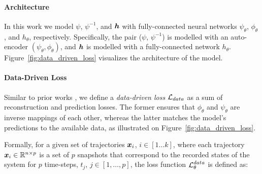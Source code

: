 \paragraph{Architecture} In this work we model $\psi$, $\psi^{-1}$, and $\boldsymbol{h}$ with fully-connected neural networks $\psi_\theta$, $\phi_\theta$, and $h_\theta$, respectively. Specifically, the pair ($\psi$, $\psi^{-1}$) is modelled with an auto-encoder $(\psi_\theta, \phi_\theta)$, and $\boldsymbol{h}$ is modelled with a fully-connected network $h_\theta$. Figure~\ref{fig:data_driven_loss} visualizes the architecture of the model.

\paragraph{Data-Driven Loss} Similar to prior works \cite{takeishi2017learning,morton2019deep,gin2021deep}, we define a \textit{data-driven loss} $\operatorname{\mathcal{L}}_{data}$ as a sum of reconstruction and prediction losses. The former ensures that $\phi_\theta$ and $\psi_\theta$ are inverse mappings of each other, whereas the latter matches the model's predictions to the available data, as illustrated on Figure~\ref{fig:data_driven_loss}.

 Formally, for a given set of trajectories $\boldsymbol{x}_i$, $i \in [1 \dots k]$, where each trajectory $\boldsymbol{x}_i \in \mathbb{R}^{n \times p}$ is a set of $p$ snapshots that correspond to the recorded states of the system for $p$ time-steps, $t_j$, $j \in [1, \dots, p]$, the loss function $\operatorname{\mathcal{L}}^{data}_\theta$ is defined as:


